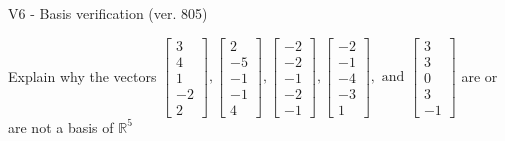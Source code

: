 \begin{exercise}
  \begin{exerciseTitle}V6 - Basis verification (ver. 805)\end{exerciseTitle}
  \begin{exerciseStatement}
    Explain why the vectors \(\left[\begin{array}{r}
3 \\
4 \\
1 \\
-2 \\
2
\end{array}\right] , \left[\begin{array}{r}
2 \\
-5 \\
-1 \\
-1 \\
4
\end{array}\right] , \left[\begin{array}{r}
-2 \\
-2 \\
-1 \\
-2 \\
-1
\end{array}\right] , \left[\begin{array}{r}
-2 \\
-1 \\
-4 \\
-3 \\
1
\end{array}\right] , \text{ and } \left[\begin{array}{r}
3 \\
3 \\
0 \\
3 \\
-1
\end{array}\right]\) are or are not a basis of \(\mathbb{R}^5\)	



\end{exerciseStatement}
\end{exercise}
